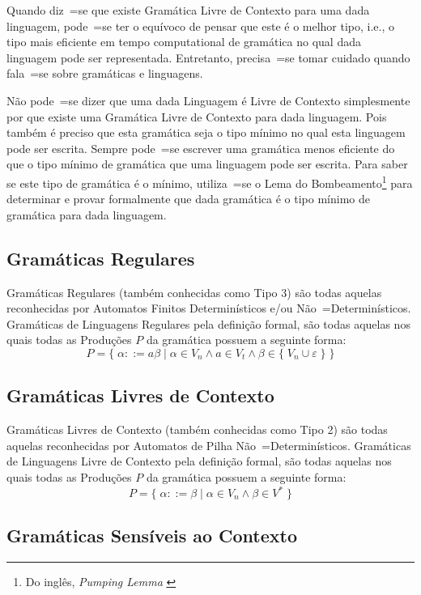 Quando diz~=se que existe Gramática Livre de Contexto para uma dada linguagem,
pode~=se ter o equívoco de pensar que este é o melhor tipo,
i.e.,
o tipo mais eficiente em tempo computational de gramática no qual dada linguagem pode ser representada.
Entretanto,
precisa~=se tomar cuidado quando fala~=se sobre gramáticas e
linguagens.

Não pode~=se dizer que uma dada Linguagem é Livre de Contexto simplesmente por que existe uma Gramática Livre de Contexto para dada linguagem.
Pois também é preciso que esta gramática seja o tipo mínimo no qual esta linguagem pode ser escrita.
Sempre pode~=se escrever uma gramática menos eficiente do que o tipo mínimo de gramática que uma linguagem pode ser escrita.
Para saber se este tipo de gramática é o mínimo,
utiliza~=se o Lema do Bombeamento\footnote{
Do inglês, \textit{Pumping Lemma} \cite{hopcroftBook,sipserBook}
}
para determinar e
provar formalmente que dada gramática é o tipo mínimo de gramática para dada linguagem.


\subsection{Gramáticas Regulares}

Gramáticas Regulares (também conhecidas como Tipo 3) são todas aquelas reconhecidas por Automatos Finitos Determinísticos e\slash{}ou Não~=Determinísticos.
Gramáticas de Linguagens Regulares pela definição formal,
são todas aquelas nos quais todas as Produções $P$ da gramática possuem a seguinte forma:
$$ P = \{\; \alpha ::= a \beta \;|\; \alpha \in V_n \land a \in V_t
            \land \beta \in \{\; V_n \cup \varepsilon\; \} \;\} $$

\subsection{Gramáticas Livres de Contexto}

Gramáticas Livres de Contexto (também conhecidas como Tipo 2) \cite{hopcroftBook} são todas aquelas reconhecidas por Automatos de Pilha Não~=Determinísticos.
Gramáticas de Linguagens Livre de Contexto pela definição formal,
são todas aquelas nos quais todas as Produções $P$ da gramática possuem a seguinte forma:
$$ P = \{\; \alpha ::= \beta \;|\; \alpha \in V_n \land \beta \in V^* \;\} $$


\subsection{Gramáticas Sensíveis ao Contexto}

